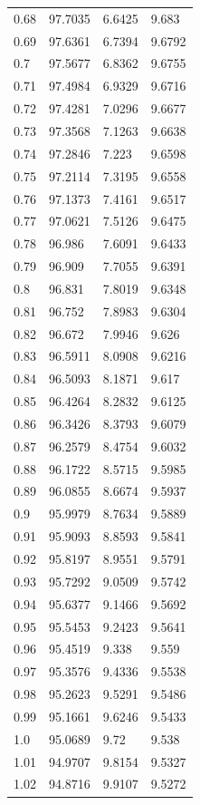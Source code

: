 \begin{tabular}{llll}
0.68 & 97.7035 & 6.6425 & 9.683 \\
0.69 & 97.6361 & 6.7394 & 9.6792 \\
0.7 & 97.5677 & 6.8362 & 9.6755 \\
0.71 & 97.4984 & 6.9329 & 9.6716 \\
0.72 & 97.4281 & 7.0296 & 9.6677 \\
0.73 & 97.3568 & 7.1263 & 9.6638 \\
0.74 & 97.2846 & 7.223 & 9.6598 \\
0.75 & 97.2114 & 7.3195 & 9.6558 \\
0.76 & 97.1373 & 7.4161 & 9.6517 \\
0.77 & 97.0621 & 7.5126 & 9.6475 \\
0.78 & 96.986 & 7.6091 & 9.6433 \\
0.79 & 96.909 & 7.7055 & 9.6391 \\
0.8 & 96.831 & 7.8019 & 9.6348 \\
0.81 & 96.752 & 7.8983 & 9.6304 \\
0.82 & 96.672 & 7.9946 & 9.626 \\
0.83 & 96.5911 & 8.0908 & 9.6216 \\
0.84 & 96.5093 & 8.1871 & 9.617 \\
0.85 & 96.4264 & 8.2832 & 9.6125 \\
0.86 & 96.3426 & 8.3793 & 9.6079 \\
0.87 & 96.2579 & 8.4754 & 9.6032 \\
0.88 & 96.1722 & 8.5715 & 9.5985 \\
0.89 & 96.0855 & 8.6674 & 9.5937 \\
0.9 & 95.9979 & 8.7634 & 9.5889 \\
0.91 & 95.9093 & 8.8593 & 9.5841 \\
0.92 & 95.8197 & 8.9551 & 9.5791 \\
0.93 & 95.7292 & 9.0509 & 9.5742 \\
0.94 & 95.6377 & 9.1466 & 9.5692 \\
0.95 & 95.5453 & 9.2423 & 9.5641 \\
0.96 & 95.4519 & 9.338 & 9.559 \\
0.97 & 95.3576 & 9.4336 & 9.5538 \\
0.98 & 95.2623 & 9.5291 & 9.5486 \\
0.99 & 95.1661 & 9.6246 & 9.5433 \\
1.0 & 95.0689 & 9.72 & 9.538 \\
1.01 & 94.9707 & 9.8154 & 9.5327 \\
1.02 & 94.8716 & 9.9107 & 9.5272 \\

\end{tabular}
